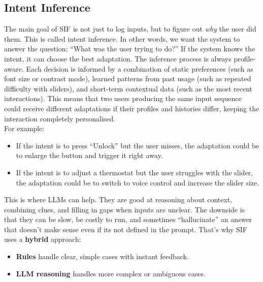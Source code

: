 \subsection{Intent Inference}
The main goal of SIF is not just to log inputs, but to figure out \textit{why} the user did them. This is called intent inference. In other words, we want the system to answer the question: “What was the user trying to do?”
If the system knows the intent, it can choose the best adaptation. The inference process is always profile-aware. Each decision is informed by a combination of static preferences (such as font size or contrast mode), learned patterns from past usage (such as repeated difficulty with sliders), and short-term contextual data (such as the most recent interactions). This means that two users producing the same input sequence could receive different adaptations if their profiles and histories differ, keeping the interaction completely personalised. 
\\For example:
\begin{itemize}
    \item If the intent is to press “Unlock” but the user misses, the adaptation could be to enlarge the button and trigger it right away.
    \item If the intent is to adjust a thermostat but the user struggles with the slider, the adaptation could be to switch to voice control and increase the slider size.
\end{itemize}

This is where LLMs can help. They are good at reasoning about context, combining clues, and filling in gaps when inputs are unclear. The downside is that they can be slow, be costly to run, and sometimes “hallucinate” an answer that doesn’t make sense even if its not defined in the prompt. That’s why SIF uses a \textbf{hybrid} approach:
\begin{itemize}
    \item \textbf{Rules} handle clear, simple cases with instant feedback.
    \item \textbf{LLM reasoning} handles more complex or ambiguous cases.
\end{itemize}

